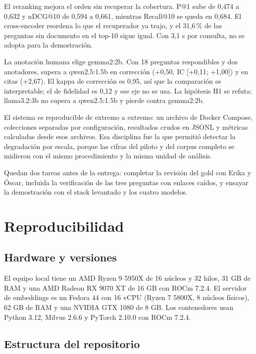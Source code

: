 \documentclass[11pt]{tg_usta}
\begin{document}
El reranking mejora el orden sin recuperar la cobertura. P@1 sube de 0,474 a 0,632 y nDCG@10 de 0,594 a 0,661, mientras Recall@10 se queda en 0,684. El cross-encoder reordena lo que el recuperador ya trajo, y el 31,6\,\% de las preguntas sin documento en el top-10 sigue igual. Con 3,1 s por consulta, no se adopta para la demostración.

La anotación humana elige gemma2:2b. Con 18 preguntas respondibles y dos anotadores, supera a qwen2.5:1.5b en corrección (+0,50, IC [+0,11; +1,00]) y en citas (+2,67). El kappa de corrección es 0,95, así que la comparación es interpretable; el de fidelidad es 0,12 y ese eje no se usa. La hipótesis H1 se refuta: llama3.2:3b no supera a qwen2.5:1.5b y pierde contra gemma2:2b.

El sistema es reproducible de extremo a extremo: un archivo de Docker Compose, colecciones separadas por configuración, resultados crudos en JSONL y métricas calculadas desde esos archivos. Esa disciplina fue la que permitió detectar la degradación por escala, porque las cifras del piloto y del corpus completo se midieron con el mismo procedimiento y la misma unidad de análisis.

Quedan dos tareas antes de la entrega: completar la revisión del gold con Erika y Óscar, incluida la verificación de las tres preguntas con enlaces caídos, y ensayar la demostración con el stack levantado y los cuatro modelos.


\nocite{*}


\appendix

\section{Reproducibilidad}

\subsection{Hardware y versiones}

El equipo local tiene un AMD Ryzen 9 5950X de 16 núcleos y 32 hilos, 31 GB de RAM y una AMD Radeon RX 9070 XT de 16 GB con ROCm 7.2.4. El servidor de embeddings es un Fedora 44 con 16 vCPU (Ryzen 7 5800X, 8 núcleos físicos), 62 GB de RAM y una NVIDIA GTX 1080 de 8 GB. Los contenedores usan Python 3.12, Milvus 2.6.6 y PyTorch 2.10.0 con ROCm 7.2.4.

\subsection{Estructura del repositorio}
\end{document}
